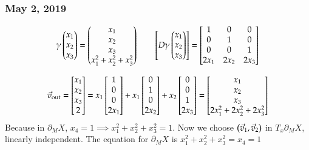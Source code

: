 \subsubsection*{May 2, 2019}
\[\gamma\begin{pmatrix} x_1 \\ x_2 \\ x_3 \end{pmatrix}=\begin{pmatrix} x_1 \\ x_2 \\ x_3 \\ x_1^2 + x_2^2 + x_3^2 \end{pmatrix}\qquad \begin{bmatrix} D\gamma\begin{pmatrix} x_1 \\ x_2 \\ x_3 \end{pmatrix} \end{bmatrix}=\begin{bmatrix} 1 & 0 & 0 \\ 0 & 1 & 0 \\ 0 & 0 & 1 \\ 2x_1 & 2x_2 & 2x_3 \end{bmatrix}\]

\[\vec{v}_{\mathrm{out}}=\begin{bmatrix} x_1 \\ x_2 \\ x_3 \\ 2 \end{bmatrix}=x_1\begin{bmatrix} 1 \\ 0 \\ 0 \\ 2x_1 \end{bmatrix}+x_1\begin{bmatrix} 0 \\ 1 \\ 0 \\ 2x_2 \end{bmatrix}+x_2\begin{bmatrix} 0 \\ 0 \\ 1 \\ 2x_3 \end{bmatrix}=\begin{bmatrix} x_1 \\ x_2 \\ x_3 \\ 2x_1^2 + 2x_2^2 + 2x_3^2 \end{bmatrix}\]
Because in $\partial_M X$, $x_4=1\implies x_1^2+x_2^2+x_3^2=1$. Now we choose $\left( \vec{v}_1, \vec{v}_2 \right)$ in $T_x\partial_M X$, linearly independent. The equation for $\partial_M X$ is $x_1^2 + x_2^2 + x_3^2 =x_4=1$